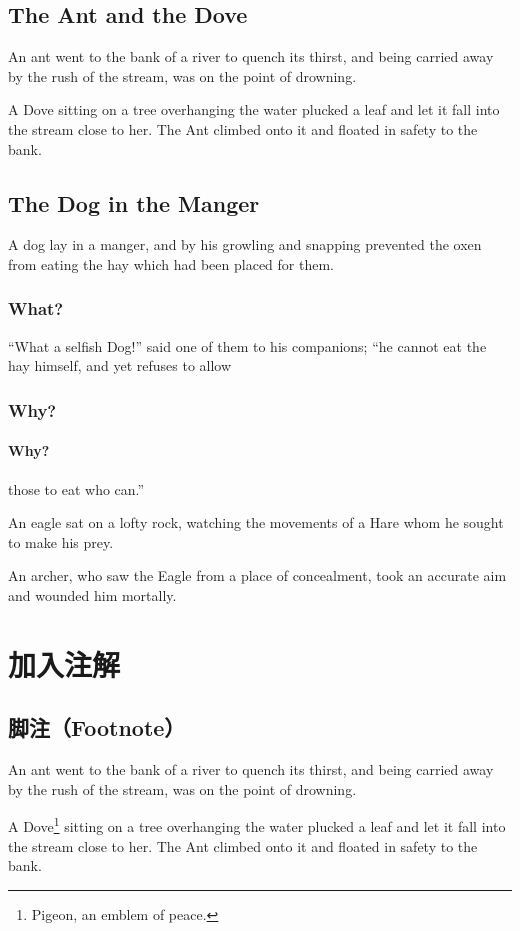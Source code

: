 \documentclass{report}
\begin{document}
\section{The Ant and the Dove}

An ant went to the bank of a river to quench its thirst, and
being carried away by the rush of the stream, was on the
point of drowning.

A Dove sitting on a tree overhanging the water plucked a
leaf and let it fall into the stream close to her. The Ant
climbed onto it and floated in safety to the bank.

\section{The Dog in the Manger}

A dog lay in a manger, and by his growling and snapping
prevented the oxen from eating the hay which had been
placed for them.

\subsection{What?}
``What a selfish Dog!'' said one of them to his companions;
``he cannot eat the hay himself, and yet refuses to allow
\subsection{Why?}
\subsubsection{Why?}
those to eat who can.''


An eagle sat on a lofty rock, watching the movements of a
Hare whom he sought to make his prey.

An archer, who saw the Eagle from a place of concealment,
took an accurate aim and wounded him mortally.


\chapter{加入注解}
\section{脚注（Footnote）}
An ant went to the bank of a river to quench its thirst, and
being carried away by the rush of the stream, was on the
point of drowning.

A Dove\footnote{Pigeon, an emblem of peace.}
sitting on a tree overhanging the water plucked a
leaf and let it fall into the stream close to her. The Ant
climbed onto it and floated in safety to the bank.
\end{document}
